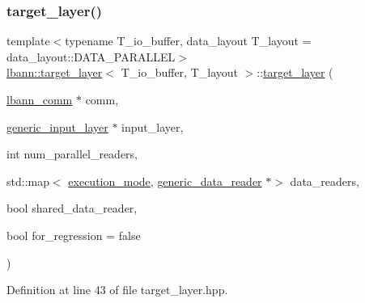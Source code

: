 \subsubsection{\texorpdfstring{target\+\_\+layer()}{target\_layer()}\hspace{0.1cm}{\footnotesize\ttfamily [1/2]}}
{\footnotesize\ttfamily template$<$typename T\+\_\+io\+\_\+buffer, data\+\_\+layout T\+\_\+layout = data\+\_\+layout\+::\+D\+A\+T\+A\+\_\+\+P\+A\+R\+A\+L\+L\+EL$>$ \\
\hyperlink{classlbann_1_1target__layer}{lbann\+::target\+\_\+layer}$<$ T\+\_\+io\+\_\+buffer, T\+\_\+layout $>$\+::\hyperlink{classlbann_1_1target__layer}{target\+\_\+layer} (\begin{DoxyParamCaption}\item[{\hyperlink{classlbann_1_1lbann__comm}{lbann\+\_\+comm} $\ast$}]{comm,  }\item[{\hyperlink{classlbann_1_1generic__input__layer}{generic\+\_\+input\+\_\+layer} $\ast$}]{input\+\_\+layer,  }\item[{int}]{num\+\_\+parallel\+\_\+readers,  }\item[{std\+::map$<$ \hyperlink{base_8hpp_a2781a159088df64ed7d47cc91c4dc0a8}{execution\+\_\+mode}, \hyperlink{classlbann_1_1generic__data__reader}{generic\+\_\+data\+\_\+reader} $\ast$$>$}]{data\+\_\+readers,  }\item[{bool}]{shared\+\_\+data\+\_\+reader,  }\item[{bool}]{for\+\_\+regression = {\ttfamily false} }\end{DoxyParamCaption})\hspace{0.3cm}{\ttfamily [inline]}}



Definition at line 43 of file target\+\_\+layer.\+hpp.


